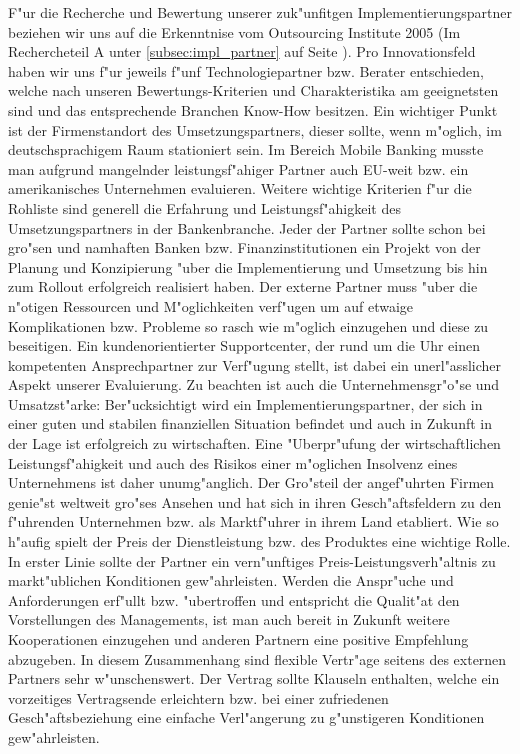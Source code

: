 F"ur die Recherche und Bewertung unserer zuk"unfitgen Implementierungspartner beziehen wir uns auf die Erkenntnise vom Outsourcing Institute 2005 (Im Rechercheteil A unter \ref{subsec:impl_partner} auf Seite \pageref{subsec:impl_partner}). Pro Innovationsfeld haben wir uns f"ur jeweils f"unf Technologiepartner bzw. Berater entschieden, welche nach unseren Bewertungs-Kriterien und Charakteristika am geeignetsten sind und das entsprechende Branchen Know-How besitzen. Ein wichtiger Punkt ist der Firmenstandort des Umsetzungspartners, dieser sollte, wenn m"oglich, im deutschsprachigem Raum stationiert sein. Im Bereich Mobile Banking musste man aufgrund mangelnder leistungsf"ahiger Partner auch EU-weit bzw. ein amerikanisches Unternehmen evaluieren. Weitere wichtige Kriterien f"ur die Rohliste sind generell die Erfahrung und Leistungsf"ahigkeit des Umsetzungspartners in der Bankenbranche. Jeder der Partner sollte schon bei gro"sen und namhaften Banken bzw. Finanzinstitutionen ein Projekt von der Planung und Konzipierung "uber die Implementierung und Umsetzung bis hin zum Rollout erfolgreich realisiert haben. Der externe Partner muss "uber die n"otigen Ressourcen und M"oglichkeiten verf"ugen um auf etwaige Komplikationen bzw. Probleme so rasch wie m"oglich einzugehen und diese zu beseitigen. Ein kundenorientierter Supportcenter, der rund um die Uhr einen kompetenten Ansprechpartner zur Verf"ugung stellt, ist dabei ein unerl"asslicher Aspekt unserer Evaluierung. Zu beachten ist auch die Unternehmensgr"o"se und Umsatzst"arke: Ber"ucksichtigt wird ein Implementierungspartner, der sich in einer guten und stabilen finanziellen Situation befindet und auch in Zukunft in der Lage ist erfolgreich zu wirtschaften. Eine "Uberpr"ufung der wirtschaftlichen Leistungsf"ahigkeit und auch des Risikos einer m"oglichen Insolvenz eines Unternehmens ist daher unumg"anglich. Der Gro"steil der angef"uhrten Firmen genie"st weltweit gro"ses Ansehen und hat sich in ihren Gesch"aftsfeldern zu den f"uhrenden Unternehmen bzw. als Marktf"uhrer in ihrem Land etabliert. Wie so h"aufig spielt der Preis der Dienstleistung bzw. des Produktes eine wichtige Rolle. In erster Linie sollte der Partner ein vern"unftiges Preis-Leistungsverh"altnis zu markt"ublichen Konditionen gew"ahrleisten. Werden die Anspr"uche und Anforderungen erf"ullt bzw. "ubertroffen und entspricht die Qualit"at den Vorstellungen des Managements, ist man auch bereit in Zukunft weitere Kooperationen einzugehen und anderen Partnern eine positive Empfehlung abzugeben. In diesem Zusammenhang sind flexible Vertr"age seitens des externen Partners sehr w"unschenswert. Der Vertrag sollte Klauseln enthalten, welche ein vorzeitiges Vertragsende erleichtern bzw. bei einer zufriedenen Gesch"aftsbeziehung eine einfache Verl"angerung zu g"unstigeren Konditionen gew"ahrleisten. 